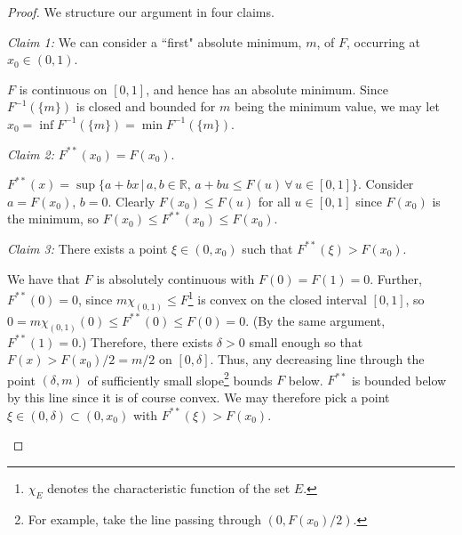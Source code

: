 \documentclass[10pt,a4paper]{amsart}
\numberwithin{equation}{section}
\begin{document}
\begin{proof}
    We structure our argument in four claims.  
    
    \textit{Claim 1:} We can consider a ``first" absolute minimum, $m$, of $F$, occurring at $x_0\in(0,1)$. 
    
    $F$ is continuous on $[0,1]$, and hence has an absolute minimum. Since $F^{-1}(\{m\})$ is closed and bounded for $m$ being the minimum value, we may let $x_0=\inf F^{-1}(\{m\})=\min F^{-1}(\{m\})$. 

    \textit{Claim 2:} $F^{**}(x_0)=F(x_0)$.

    $F^{**}(x)=\sup\{a+bx \, | \, a,b\in\mathbb{R}\text{, } a+bu\leq F(u) \, \forall \, u\in[0,1]\}$. Consider $a=F(x_0)$, $b=0$. Clearly $F(x_0)\leq F(u)$ for all $u\in[0,1]$ since $F(x_0)$ is the minimum, so $F(x_0)\leq F^{**}(x_0)\leq F(x_0)$.

    \textit{Claim 3:} There exists a point $\xi\in(0,x_0)$ such that $F^{**}(\xi)>F(x_0)$.

    We have that $F$ is absolutely continuous with $F(0)=F(1)=0$. Further, $F^{**}(0)=0$, since 
    $m\chi_{(0,1)}\leq F$\footnote{$\chi_E$ denotes the characteristic function of the set $E$.} is convex on the closed interval $[0,1]$, so
    $0=m\chi_{(0,1)}(0)\leq F^{**}(0)\leq F(0)=0$. (By the same argument, $F^{**}(1)=0$.) Therefore, there exists $\delta>0$ small enough so that $F(x)>F(x_0)/2=m/2$ on $[0,\delta]$. Thus, any decreasing line through the point $(\delta,m)$ of sufficiently small slope\footnote{For example, take the line passing through $(0,F(x_0)/2)$.} bounds $F$ below. $F^{**}$ is bounded below by this line since it is of course convex. We may therefore pick a point $\xi\in(0,\delta)\subset(0,x_0)$ with $F^{**}(\xi)>F(x_0)$. 

    \begin{figure}
    \centering
\end{figure}
\end{proof}
\end{document}
